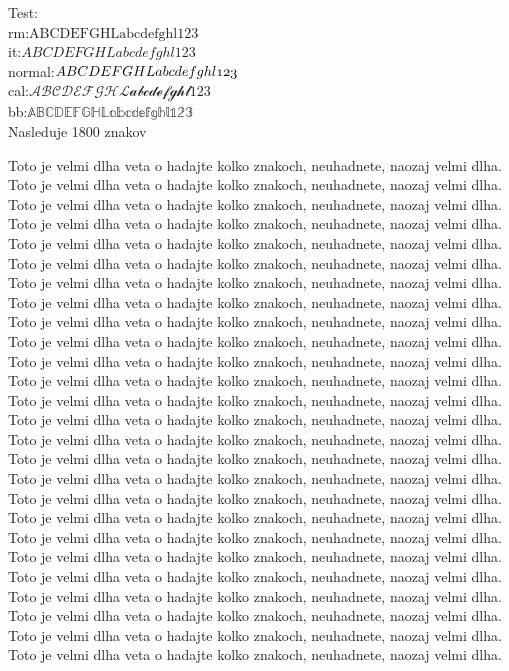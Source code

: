 Test:\\
rm:$\mathrm{ABCDEFGHL abcdefghl 123}$\\
it:$\mathit{ABCDEFGHL abcdefghl 123}$\\
normal:$\mathnormal{ABCDEFGHL abcdefghl 123}$\\
cal:$\mathcal{ABCDEFGHL abcdefghl 123}$\\
bb:$\mathbb{ABCDEFGHL abcdefghl 123}$\\

Nasleduje 1800 znakov

Toto je velmi dlha veta o hadajte kolko znakoch, neuhadnete, naozaj velmi dlha.
Toto je velmi dlha veta o hadajte kolko znakoch, neuhadnete, naozaj velmi dlha.
Toto je velmi dlha veta o hadajte kolko znakoch, neuhadnete, naozaj velmi dlha.
Toto je velmi dlha veta o hadajte kolko znakoch, neuhadnete, naozaj velmi dlha.
Toto je velmi dlha veta o hadajte kolko znakoch, neuhadnete, naozaj velmi dlha.
Toto je velmi dlha veta o hadajte kolko znakoch, neuhadnete, naozaj velmi dlha.
Toto je velmi dlha veta o hadajte kolko znakoch, neuhadnete, naozaj velmi dlha.
Toto je velmi dlha veta o hadajte kolko znakoch, neuhadnete, naozaj velmi dlha.
Toto je velmi dlha veta o hadajte kolko znakoch, neuhadnete, naozaj velmi dlha.
Toto je velmi dlha veta o hadajte kolko znakoch, neuhadnete, naozaj velmi dlha.
Toto je velmi dlha veta o hadajte kolko znakoch, neuhadnete, naozaj velmi dlha.
Toto je velmi dlha veta o hadajte kolko znakoch, neuhadnete, naozaj velmi dlha.
Toto je velmi dlha veta o hadajte kolko znakoch, neuhadnete, naozaj velmi dlha.
Toto je velmi dlha veta o hadajte kolko znakoch, neuhadnete, naozaj velmi dlha.
Toto je velmi dlha veta o hadajte kolko znakoch, neuhadnete, naozaj velmi dlha.
Toto je velmi dlha veta o hadajte kolko znakoch, neuhadnete, naozaj velmi dlha.
Toto je velmi dlha veta o hadajte kolko znakoch, neuhadnete, naozaj velmi dlha.
Toto je velmi dlha veta o hadajte kolko znakoch, neuhadnete, naozaj velmi dlha.
Toto je velmi dlha veta o hadajte kolko znakoch, neuhadnete, naozaj velmi dlha.
Toto je velmi dlha veta o hadajte kolko znakoch, neuhadnete, naozaj velmi dlha.
Toto je velmi dlha veta o hadajte kolko znakoch, neuhadnete, naozaj velmi dlha.
Toto je velmi dlha veta o hadajte kolko znakoch, neuhadnete, naozaj velmi dlha.
Toto je velmi dlha veta o hadajte kolko znakoch, neuhadnete, naozaj velmi dlha.
Toto je velmi dlha veta o hadajte kolko znakoch, neuhadnete, naozaj velmi dlha.
Toto je velmi dlha veta o hadajte kolko znakoch, neuhadnete, naozaj velmi dlha.
Toto je velmi dlha veta o hadajte kolko znakoch, neuhadnete, naozaj velmi dlha.
